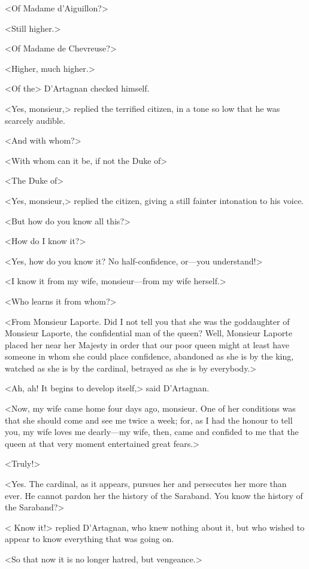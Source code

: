 <Of Madame d'Aiguillon?> 

<Still higher.> 

<Of Madame de Chevreuse?> 

<Higher, much higher.> 

<Of the\longdash> D'Artagnan checked himself. 

<Yes, monsieur,> replied the terrified citizen, in a tone so low that he was scarcely audible. 

<And with whom?> 

<With whom can it be, if not the Duke of\longdash> 

<The Duke of\longdash> 

<Yes, monsieur,> replied the citizen, giving a still fainter intonation to his voice. 

<But how do you know all this?> 

<How do I know it?> 

<Yes, how do you know it? No half-confidence, or—you understand!> 

<I know it from my wife, monsieur—from my wife herself.> 

<Who learns it from whom?> 

<From Monsieur Laporte. Did I not tell you that she was the goddaughter of Monsieur Laporte, the confidential man of the queen? Well, Monsieur Laporte placed her near her Majesty in order that our poor queen might at least have someone in whom she could place confidence, abandoned as she is by the king, watched as she is by the cardinal, betrayed as she is by everybody.> 

<Ah, ah! It begins to develop itself,> said D'Artagnan. 

<Now, my wife came home four days ago, monsieur. One of her conditions was that she should come and see me twice a week; for, as I had the honour to tell you, my wife loves me dearly—my wife, then, came and confided to me that the queen at that very moment entertained great fears.> 

<Truly!> 

<Yes. The cardinal, as it appears, pursues her and persecutes her more than ever. He cannot pardon her the history of the Saraband. You know the history of the Saraband?> 

< Know it!> replied D'Artagnan, who knew nothing about it, but who wished to appear to know everything that was going on. 

<So that now it is no longer hatred, but vengeance.> 

